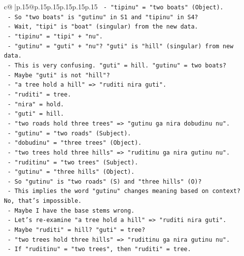 \documentclass{article}
\begin{document}
{\begin{supertabular}{c@{$\;$}|p{.15\linewidth}@{}p{.15\linewidth}p{.15\linewidth}p{.15\linewidth}p{.15\linewidth}p{.15\linewidth}}
{{{\texttt{          {-} "tipinu" = "two boats" (Object).} \\
\texttt{          {-} So "two boats" is "gutinu" in S1 and "tipinu" in S4?} \\
\texttt{          {-} Wait, "tipi" is "boat" (singular) from the new data.} \\
\texttt{          {-} "tipinu" = "tipi" + "nu".} \\
\texttt{          {-} "gutinu" = "guti" + "nu"? "guti" is "hill" (singular) from new data.} \\
\texttt{          {-} This is very confusing. "guti" = hill. "gutinu" = two boats?} \\
\texttt{          {-} Maybe "guti" is not "hill"?} \\
\texttt{          {-} "a tree hold a hill" => "ruditi nira guti".} \\
\texttt{            {-} "ruditi" = tree.} \\
\texttt{            {-} "nira" = hold.} \\
\texttt{            {-} "guti" = hill.} \\
\texttt{          {-} "two roads hold three trees" => "gutinu ga nira dobudinu nu".} \\
\texttt{            {-} "gutinu" = "two roads" (Subject).} \\
\texttt{            {-} "dobudinu" = "three trees" (Object).} \\
\texttt{          {-} "two trees hold three hills" => "ruditinu ga nira gutinu nu".} \\
\texttt{            {-} "ruditinu" = "two trees" (Subject).} \\
\texttt{            {-} "gutinu" = "three hills" (Object).} \\
\texttt{          {-} So "gutinu" is "two roads" (S) and "three hills" (O)?} \\
\texttt{          {-} This implies the word "gutinu" changes meaning based on context? No, that's impossible.} \\
\texttt{          {-} Maybe I have the base stems wrong.} \\
\texttt{          {-} Let's re{-}examine "a tree hold a hill" => "ruditi nira guti".} \\
\texttt{            {-} Maybe "ruditi" = hill? "guti" = tree?} \\
\texttt{            {-} "two trees hold three hills" => "ruditinu ga nira gutinu nu".} \\
\texttt{              {-} If "ruditinu" = "two trees", then "ruditi" = tree.} \\
}}}
\end{supertabular}}
\end{document}
